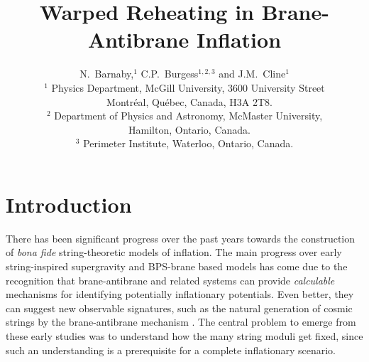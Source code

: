 \documentclass[12pt]{JHEP3}
\title{Warped Reheating in Brane-Antibrane Inflation}
\author{N.\ Barnaby,${}^1$ C.P.\ Burgess${}^{1,2,3}$ and J.M.\ Cline${}^1$\\
${}^1$ Physics Department, McGill University, 3600 University
Street\\
~~Montr{\'e}al, Qu{\'e}bec, Canada, H3A 2T8. \\
${}^2$ Department of Physics and Astronomy, McMaster University,\\
~~Hamilton, Ontario, Canada.\\
${}^3$ Perimeter Institute, Waterloo, Ontario, Canada. }
\begin{document}
\makeatletter {} \makeatother
\renewcommand{\theequation}{\thesection.\arabic{equation}}


\setcounter{page}{1} \pagestyle{plain}
\renewcommand{\thefootnote}{\arabic{footnote}}
\setcounter{footnote}{0}



\section{Introduction}

There has been significant progress over the past years towards
the construction of {\it bona fide} string-theoretic models of
inflation. The main progress over early string-inspired
supergravity \cite{SugraInflation} and BPS-brane based
\cite{DvaliTye} models has come due to the recognition that
brane-antibrane \cite{BI1,BBbarInflation} and related
\cite{Angles,Others} systems can provide {\it calculable}
mechanisms for identifying potentially inflationary potentials.
Even better, they can suggest new observable signatures, such as
the natural generation of cosmic strings by the brane-antibrane
mechanism \cite{BI1,cosmicstrings}. The central problem to emerge
from these early studies was to understand how the many string
moduli get fixed, since such an understanding is a prerequisite
for a complete inflationary scenario.
\end{document}

